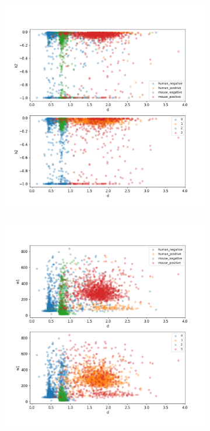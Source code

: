\begin{figure}
\begin{subfigure}{0.3\textwidth}
	\end{subfigure}
	\hfill
	\begin{subfigure}{0.3\textwidth}
		\includegraphics[width=\textwidth]{fig/seperate_d_k2}
	\end{subfigure}
	\hfill
	\begin{subfigure}{0.3\textwidth}
		\includegraphics[width=\textwidth]{fig/seperate_d_w1}

\end{subfigure}
\end{figure}

